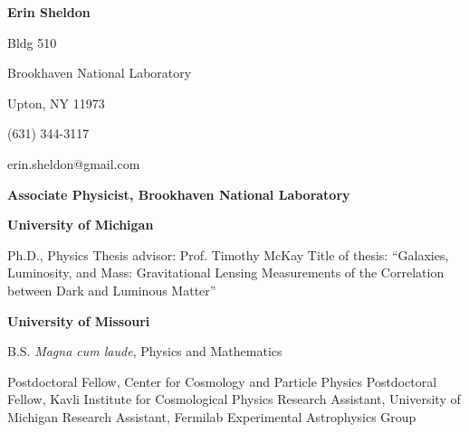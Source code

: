 \documentclass[12pt]{article}
\begin{document}

\newcommand{\tsp}{\vspace{0.1cm}}
\newcommand{\isp}{\vspace{0.3cm}}
\newcommand{\ssp}{\vspace{0.4cm}}


{\Large {\bf Erin Sheldon}}
\tsp
%
%

\noindent
Bldg 510

\noindent
Brookhaven National Laboratory

\noindent
Upton, NY 11973

\noindent
(631) 344-3117

\noindent
erin.sheldon@gmail.com


\ssp
\ssp
\noindent
{}
{\bf Associate Physicist, Brookhaven National Laboratory}

\hfill
{}
\normalsize




\ssp
\ssp
\noindent
{}
{\bf University of Michigan}
\hfill
{}
\normalsize

\tsp
\noindent
\makebox[1.25in][l]{}
\parbox{5.40in}{
Ph.D., Physics\newline
Thesis advisor: Prof. Timothy McKay\newline
Title of thesis: ``Galaxies, Luminosity, and Mass: Gravitational Lensing Measurements of the Correlation between Dark and Luminous Matter''
}

\isp
\noindent
\makebox[1.25in][l]{}
{\bf University of Missouri}
\hfill
{}
\normalsize

\tsp
\noindent
\makebox[1.25in][l]{}
\parbox{5.40in}{B.S. {\it Magna cum laude}, Physics and Mathematics}

%
%

\ssp
\ssp
\noindent
{}
	{Postdoctoral Fellow, Center for Cosmology and Particle Physics}
        \newline
{}
        \hfill
\newline
\makebox[1.25in][l]{}
	{Postdoctoral Fellow, Kavli Institute for Cosmological Physics}
	\newline
{}
	\hfill
\newline
\makebox[1.25in][l]{}
	{{Research Assistant, University of Michigan}}
	\hfill
\newline
\makebox[1.25in][l]{}
	{Research Assistant, Fermilab Experimental Astrophysics Group}
\end{document}
